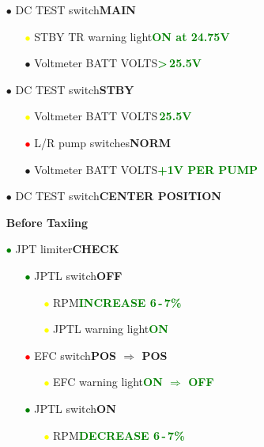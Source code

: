 \documentclass[a4paper,12pt,dvipsnames]{letter}
\newcommand{\button}[1]{\textbf{#1}}
\newcommand{\ok}[1]{\textcolor{Green}{\textbf{#1}}}
\newcommand{\bi}{\textcolor{ProcessBlue}{$\bullet$\;}}
\newcommand{\ri}{\textcolor{Red}{$\bullet$\;}}
\newcommand{\gi}{\textcolor{Green}{$\bullet$\;}}
\newcommand{\yi}{\textcolor{Yellow}{$\bullet$\;}}
\begin{document}
{\begin{itemize}
\begin{itemize}
\begin{itemize}
  \item[\bi] Voltmeter BATT VOLTS\dotfill\ok{27\;V STABLE}
 \end{itemize}
 \item[\bi] DC TEST switch\dotfill\button{MAIN}
 \begin{itemize}
  \item[\yi] STBY TR warning light\dotfill\ok{ON at 24.75\;V}
  \item[\bi] Voltmeter BATT VOLTS\dotfill\ok{>\,25.5\;V}
 \end{itemize}
 \item[\bi] DC TEST switch\dotfill\button{STBY}
 \begin{itemize}
  \item[\yi] Voltmeter BATT VOLTS\dotfill\ok{\texttildelow\,25.5\;V}
  \item[\ri] L/R pump switches\dotfill\button{NORM}
  \item[\bi] Voltmeter BATT VOLTS\dotfill\ok{+1\;V PER PUMP}
 \end{itemize}
 \item[\bi] DC TEST switch\dotfill\button{CENTER POSITION}
\end{itemize}
\end{itemize}
\newpage
\begin{itemize}
\item[] {\LARGE\textbf{Before Taxiing}}
\item[\gi] JPT limiter\dotfill\button{CHECK}
\begin{itemize}
 \item[\gi] JPTL switch\dotfill\button{OFF}
 \begin{itemize}
  \item[\yi] RPM\dotfill\ok{INCREASE 6\,-\,7\%}
  \item[\yi] JPTL warning light\dotfill\ok{ON}
 \end{itemize}
 \item[\ri] EFC switch\dotfill\button{POS $\Rightarrow$ POS}
 \begin{itemize}
  \item[\yi] EFC warning light\dotfill\ok{ON $\Rightarrow$ OFF}
 \end{itemize}
 \item[\gi] JPTL switch\dotfill\button{ON}
 \begin{itemize}
  \item[\yi] RPM\dotfill\ok{DECREASE 6\,-\,7\%}

\end{itemize}
\end{itemize}
\end{itemize}}
\end{document}
